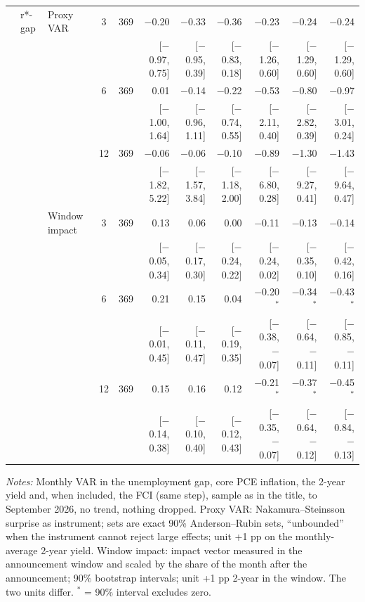 \begin{table}[tp]
{\begin{tabular}{lllcrrrrrrr}
 & r*-gap & Proxy VAR & 3 & 369 & $-$0.20 & $-$0.33 & $-$0.36 & $-$0.23 & $-$0.24 & $-$0.24\\
 & & & & & {\tiny [$-$0.97, 0.75]} & {\tiny [$-$0.95, 0.39]} & {\tiny [$-$0.83, 0.18]} & {\tiny [$-$1.26, 0.60]} & {\tiny [$-$1.29, 0.60]} & {\tiny [$-$1.29, 0.60]}\\
 &  &  & 6 & 369 & 0.01 & $-$0.14 & $-$0.22 & $-$0.53 & $-$0.80 & $-$0.97\\
 & & & & & {\tiny [$-$1.00, 1.64]} & {\tiny [$-$0.96, 1.11]} & {\tiny [$-$0.74, 0.55]} & {\tiny [$-$2.11, 0.40]} & {\tiny [$-$2.82, 0.39]} & {\tiny [$-$3.01, 0.24]}\\
 &  &  & 12 & 369 & $-$0.06 & $-$0.06 & $-$0.10 & $-$0.89 & $-$1.30 & $-$1.43\\
 & & & & & {\tiny [$-$1.82, 5.22]} & {\tiny [$-$1.57, 3.84]} & {\tiny [$-$1.18, 2.00]} & {\tiny [$-$6.80, 0.28]} & {\tiny [$-$9.27, 0.41]} & {\tiny [$-$9.64, 0.47]}\\
 &  & Window impact & 3 & 369 & 0.13 & 0.06 & 0.00 & $-$0.11 & $-$0.13 & $-$0.14\\
 & & & & & {\tiny [$-$0.05, 0.34]} & {\tiny [$-$0.17, 0.30]} & {\tiny [$-$0.24, 0.22]} & {\tiny [$-$0.24, 0.02]} & {\tiny [$-$0.35, 0.10]} & {\tiny [$-$0.42, 0.16]}\\
 &  &  & 6 & 369 & 0.21 & 0.15 & 0.04 & $-$0.20$^{*}$ & $-$0.34$^{*}$ & $-$0.43$^{*}$\\
 & & & & & {\tiny [$-$0.01, 0.45]} & {\tiny [$-$0.11, 0.47]} & {\tiny [$-$0.19, 0.35]} & {\tiny [$-$0.38, $-$0.07]} & {\tiny [$-$0.64, $-$0.11]} & {\tiny [$-$0.85, $-$0.11]}\\
 &  &  & 12 & 369 & 0.15 & 0.16 & 0.12 & $-$0.21$^{*}$ & $-$0.37$^{*}$ & $-$0.45$^{*}$\\
 & & & & & {\tiny [$-$0.14, 0.38]} & {\tiny [$-$0.10, 0.40]} & {\tiny [$-$0.12, 0.43]} & {\tiny [$-$0.35, $-$0.07]} & {\tiny [$-$0.64, $-$0.12]} & {\tiny [$-$0.84, $-$0.13]}\\
\bottomrule\end{tabular}}
\begin{flushleft}\footnotesize\textit{Notes:} Monthly VAR in the unemployment gap, core PCE inflation, the 2-year yield and, when included, the FCI (same step), sample as in the title, to September 2026, no trend, nothing dropped. Proxy VAR: Nakamura--Steinsson surprise as instrument; sets are exact 90\% Anderson--Rubin sets, ``unbounded'' when the instrument cannot reject large effects; unit +1 pp on the monthly-average 2-year yield. Window impact: impact vector measured in the announcement window and scaled by the share of the month after the announcement; 90\% bootstrap intervals; unit +1 pp 2-year in the window. The two units differ. $^{*}$ = 90\% interval excludes zero.\end{flushleft}
\end{table}
